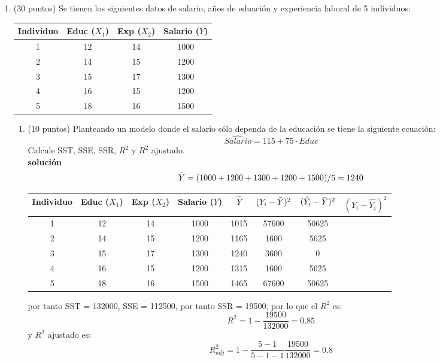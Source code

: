 \documentclass[10pt,a4paper]{article}
\begin{document}
\begin{enumerate}
\begin{enumerate}
    \item (5 puntos) ¿Qué representan los valores de $\hat{\beta_0}$ y $\hat{\beta_1}$?\\
    \textbf{solución}
    \\
    El valor de $\hat{\beta_0}$ representa el intercepto de la RLS, mientras que el valor de $\hat{\beta_1}$ indica cuanto cambia Y, cuando X cambia en 1 unidad.
\end{enumerate}

\item (30 puntos) Se tienen los siguientes datos de salario, años de eduación y experiencia laboral de 5 individuos:
\begin{center}
\begin{tabular}{|c|c|c|c|}
\hline
\textbf{Individuo} & \textbf{Educ} ($X_1$) & \textbf{Exp} ($X_2$)  & \textbf{Salario ($Y$)}\\
\hline
1 & 12 & 14 & 1000 \\
2 & 14 & 15 & 1200 \\
3 & 15 & 17 & 1300 \\
4 & 16 & 15 & 1200 \\
5 & 18 & 16 & 1500 \\
\hline
\end{tabular}
\end{center}

\begin{enumerate}
    \item (10 puntos) Planteando un modelo donde el salario sólo dependa de la educación se tiene la siguiente ecuación:
    $$\widehat{Salario} = 115 + 75 \cdot Educ$$
    Calcule SST, SSE, SSR, $R^2$ y $R^2$ ajustado.
    \\
    \textbf{solución}
    \\
    $$\Bar{Y}=(1000+1200+1300+1200+1500)/5 = 1240$$
\begin{center}
\begin{tabular}{|c|c|c|c|c|c|c|c|}
\hline
\textbf{Individuo} & \textbf{Educ} ($X_1$) & \textbf{Exp} ($X_2$)  & \textbf{Salario ($Y$)} & $\hat{Y}$ & $(Y_i - \Bar{Y})^2$ & $(\hat{Y_i} - \Bar{Y})^2$ & $(Y_i-\hat{Y_i})^2$\\
\hline
1 & 12 & 14 & 1000 & 1015 & 57600 & 50625& \\
2 & 14 & 15 & 1200 & 1165 & 1600  & 5625& \\
3 & 15 & 17 & 1300 & 1240 & 3600  & 0& \\
4 & 16 & 15 & 1200 & 1315 & 1600  & 5625& \\
5 & 18 & 16 & 1500 & 1465 & 67600 & 50625& \\
\hline
\end{tabular}
\end{center}
por tanto SST = 132000, SSE = 112500, por tanto SSR = 19500, por lo que el $R^2$ es:
$$R^2 = 1- \frac{19500}{132000} = 0.85$$
y $R^2$ ajustado es:
$$R^2_{adj} = 1-\frac{5-1}{5-1-1}\frac{19500}{132000} = 0.8$$


\end{enumerate}
\end{enumerate}
\end{document}
